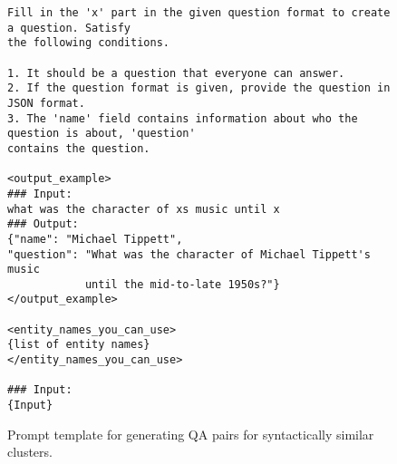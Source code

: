 \onecolumn

\begin{figure}[ht]
\begin{tcolorbox}[width=0.9\textwidth, colback=white, colframe=black, boxsep=5pt, fontupper=\small]
\begin{verbatim}
Fill in the 'x' part in the given question format to create a question. Satisfy
the following conditions.

1. It should be a question that everyone can answer.
2. If the question format is given, provide the question in JSON format.
3. The 'name' field contains information about who the question is about, 'question'
contains the question.

<output_example>
### Input:
what was the character of xs music until x
### Output:
{"name": "Michael Tippett",
"question": "What was the character of Michael Tippett's music 
            until the mid-to-late 1950s?"}
</output_example>

<entity_names_you_can_use>
{list of entity names}
</entity_names_you_can_use>

### Input:
{Input}
\end{verbatim}
\end{tcolorbox}
\caption{Prompt template for generating QA pairs for syntactically similar clusters.}
\end{figure}
\twocolumn